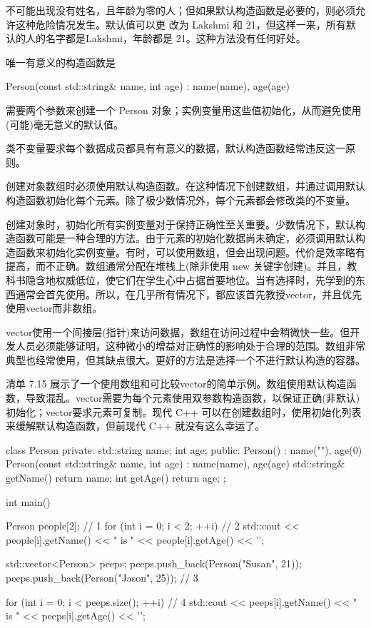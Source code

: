 
不可能出现没有姓名，且年龄为零的人；但如果默认构造函数是必要的，则必须允许这种危险情况发生。默认值可以更 改为 Lakshmi 和 21，但这样一来，所有默认的人的名字都是Lakshmi，年龄都是 21。这种方法没有任何好处。

唯一有意义的构造函数是

\begin{cpp}
Person(const std::string& name, int age) : name(name), age(age) {}
\end{cpp}

需要两个参数来创建一个 Person 对象；实例变量用这些值初始化，从而避免使用(可能)毫无意义的默认值。

类不变量要求每个数据成员都具有有意义的数据，默认构造函数经常违反这一原则。

创建对象数组时必须使用默认构造函数。在这种情况下创建数组，并通过调用默认构造函数初始化每个元素。除了极少数情况外，每个元素都会修改类的不变量。


创建对象时，初始化所有实例变量对于保持正确性至关重要。少数情况下，默认构造函数可能是一种合理的方法。由于元素的初始化数据尚未确定，必须调用默认构造函数来初始化实例变量。有时，可以使用数组，但会出现问题。代价是效率略有提高，而不正确。数组通常分配在堆栈上(除非使用 new 关键字创建)。并且，教科书隐含地权威低位，使它们在学生心中占据首要地位。当有选择时，先学到的东西通常会首先使用。所以，在几乎所有情况下，都应该首先教授vector，并且优先使用vector而非数组。

vector使用一个间接层(指针)来访问数据，数组在访问过程中会稍微快一些。但开发人员必须能够证明，这种微小的增益对正确性的影响处于合理的范围。数组非常典型也经常使用，但其缺点很大。更好的方法是选择一个不进行默认构造的容器。

清单 7.15 展示了一个使用数组和可比较vector的简单示例。数组使用默认构造函数，导致混乱。vector需要为每个元素使用双参数构造函数，以保证正确(非默认)初始化；vector要求元素可复制。现代 C++ 可以在创建数组时，使用初始化列表来缓解默认构造函数，但前现代 C++ 就没有这么幸运了。


\begin{cpp}
class Person {
  private:
  std::string name;
  int age;
public:
  Person() : name(""), age(0) {}
  Person(const std::string& name, int age) : name(name), age(age) {}
  std::string& getName() { return name; }
  int getAge() { return age; }
};

int main() {
  Person people[2]; // 1
  for (int i = 0; i < 2; ++i) // 2
    std::cout << people[i].getName() << " is " << people[i].getAge() << '\n';

    std::vector<Person> peeps;
  peeps.push_back(Person("Susan", 21));
  peeps.push_back(Person("Jason", 25)); // 3

  for (int i = 0; i < peeps.size(); ++i) // 4
    std::cout << peeps[i].getName() << " is " << peeps[i].getAge() << '\n';
}
\end{cpp}


